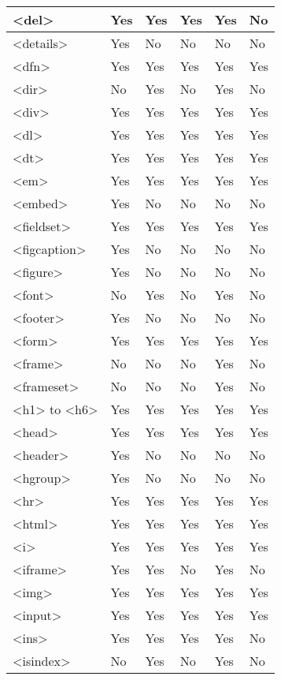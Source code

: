 \begin{longtable}{|l|l|l|l|l|l|}
\hline
<del>			&Yes	&Yes			&Yes	&Yes				&No		\\
\hline
<details>			&Yes	&No				&No		&No					&No		\\
\hline
<dfn>			&Yes	&Yes			&Yes	&Yes				&Yes	\\
\hline
<dir>			&No		&Yes			&No		&Yes				&No		\\
\hline
<div>			&Yes	&Yes			&Yes	&Yes				&Yes	\\
\hline
<dl>				&Yes	&Yes			&Yes	&Yes				&Yes	\\
\hline
<dt>				&Yes	&Yes			&Yes	&Yes				&Yes	\\
\hline
<em>			&Yes	&Yes			&Yes	&Yes				&Yes	\\
\hline
<embed>			&Yes	&No				&No		&No					&No		\\
\hline
<fieldset>		&Yes	&Yes			&Yes	&Yes				&Yes	\\
\hline
<figcaption>		&Yes	&No				&No		&No					&No		\\
\hline
<figure>			&Yes	&No				&No		&No					&No		\\
\hline
<font>			&No		&Yes			&No		&Yes				&No		\\
\hline
<footer>			&Yes	&No				&No		&No					&No		\\
\hline
<form>			&Yes	&Yes			&Yes	&Yes				&Yes	\\
\hline
<frame>			&No		&No				&No		&Yes				&No		\\
\hline
<frameset>		&No		&No				&No		&Yes				&No		\\
\hline
<h1> to <h6>		&Yes	&Yes			&Yes	&Yes				&Yes	\\
\hline
<head>			&Yes	&Yes			&Yes	&Yes				&Yes	\\
\hline
<header>			&Yes	&No				&No		&No					&No		\\
\hline
<hgroup>			&Yes	&No				&No		&No					&No		\\
\hline
<hr>				&Yes	&Yes			&Yes	&Yes				&Yes	\\
\hline
<html>			&Yes	&Yes			&Yes	&Yes				&Yes	\\
\hline
<i>				&Yes	&Yes			&Yes	&Yes				&Yes	\\
\hline
<iframe>			&Yes	&Yes			&No		&Yes				&No		\\
\hline
<img>			&Yes	&Yes			&Yes	&Yes				&Yes	\\
\hline
<input>			&Yes	&Yes			&Yes	&Yes				&Yes	\\
\hline
<ins>			&Yes	&Yes			&Yes	&Yes				&No		\\
\hline
<isindex>			&No		&Yes			&No		&Yes				&No		\\

\end{longtable}
